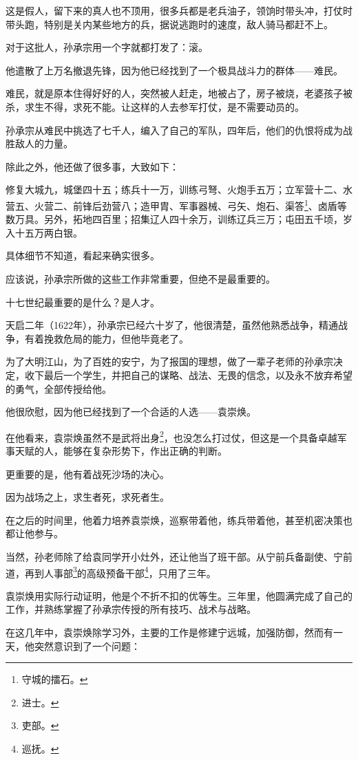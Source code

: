 \begin{multicols}{\theparacolNo}
这是假人，留下来的真人也不顶用，很多兵都是老兵油子，领饷时带头冲，打仗时带头跑，特别是关内某些地方的兵，据说逃跑时的速度，敌人骑马都赶不上。

对于这批人，孙承宗用一个字就都打发了：滚。

他遣散了上万名撤退先锋，因为他已经找到了一个极具战斗力的群体——难民。

难民，就是原本住得好好的人，突然被人赶走，地被占了，房子被烧，老婆孩子被杀，求生不得，求死不能。让这样的人去参军打仗，是不需要动员的。

孙承宗从难民中挑选了七千人，编入了自己的军队，四年后，他们的仇恨将成为战胜敌人的力量。

除此之外，他还做了很多事，大致如下：

修复大城九，城堡四十五；练兵十一万，训练弓弩、火炮手五万；立军营十二、水营五、火营二、前锋后劲营八；造甲胄、军事器械、弓矢、炮石、渠答\footnote{守城的擂石。}、卤盾等数万具。另外，拓地四百里；招集辽人四十余万，训练辽兵三万；屯田五千顷，岁入十五万两白银。

具体细节不知道，看起来确实很多。

应该说，孙承宗所做的这些工作非常重要，但绝不是最重要的。

十七世纪最重要的是什么？是人才。

天启二年（1622年），孙承宗已经六十岁了，他很清楚，虽然他熟悉战争，精通战争，有着挽救危局的能力，但他毕竟老了。

为了大明江山，为了百姓的安宁，为了报国的理想，做了一辈子老师的孙承宗决定，收下最后一个学生，并把自己的谋略、战法、无畏的信念，以及永不放弃希望的勇气，全部传授给他。

他很欣慰，因为他已经找到了一个合适的人选——袁崇焕。

在他看来，袁崇焕虽然不是武将出身\footnote{进士。}，也没怎么打过仗，但这是一个具备卓越军事天赋的人，能够在复杂形势下，作出正确的判断。

更重要的是，他有着战死沙场的决心。

因为战场之上，求生者死，求死者生。

在之后的时间里，他着力培养袁崇焕，巡察带着他，练兵带着他，甚至机密决策也都让他参与。

当然，孙老师除了给袁同学开小灶外，还让他当了班干部。从宁前兵备副使、宁前道，再到人事部\footnote{吏部。}的高级预备干部\footnote{巡抚。}，只用了三年。

袁崇焕用实际行动证明，他是个不折不扣的优等生。三年里，他圆满完成了自己的工作，并熟练掌握了孙承宗传授的所有技巧、战术与战略。

在这几年中，袁崇焕除学习外，主要的工作是修建宁远城，加强防御，然而有一天，他突然意识到了一个问题：


\end{multicols}
